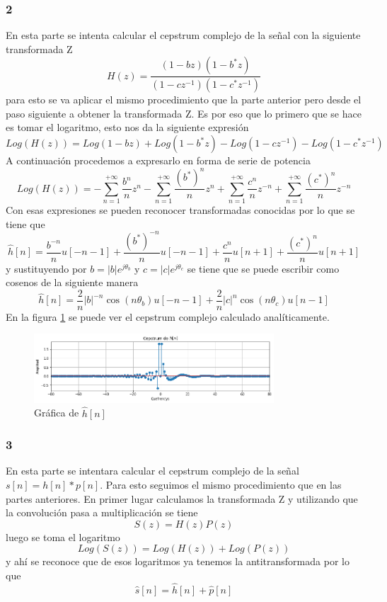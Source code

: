 \documentclass[a4paper]{article}
\begin{document}
\subsubsection{2}
En esta parte se intenta calcular el cepstrum complejo de la señal con la siguiente transformada Z
$$ H(z) = \frac{(1-bz)(1-b^*z)}{(1-cz^{-1})(1-c^*z^{-1})}$$
para esto se va aplicar el mismo procedimiento que la parte anterior pero desde el paso siguiente a obtener la transformada Z. Es por eso que lo primero que se hace es tomar el logaritmo, esto nos da la siguiente expresión
$$Log(H(z)) = Log(1-bz) + Log(1-b^*z) - Log(1-cz^{-1}) -Log(1-c^*z^{-1})$$
A continuación procedemos a expresarlo en forma de serie de potencia
$$Log(H(z)) = -\sum_{n=1}^{+\infty} \frac{b^n}{n}z^n -\sum_{n=1}^{+\infty} \frac{(b^*)^n}{n}z^n + \sum_{n=1}^{+\infty} \frac{c^n}{n}z^{-n} + \sum_{n=1}^{+\infty} \frac{(c^*)^n}{n}z^{-n}$$
Con esas expresiones se pueden reconocer transformadas conocidas por lo que se tiene que
$$\hat{h}[n] = \frac{b^{-n}}{n}u[-n-1] + \frac{(b^*)^{-n}}{n}u[-n-1] +\frac{c^{n}}{n}u[n+1]+\frac{(c^*)^{n}}{n}u[n+1]$$
y sustituyendo por $b=|b|e^{j\theta_b}$ y $c=|c|e^{j\theta_c}$ se tiene que se puede escribir como cosenos de la siguiente manera
$$\hat{h}[n]=\frac{2}{n}|b|^{-n}\cos(n\theta_b)u[-n-1] + \frac{2}{n}|c|^n\cos(n\theta_c)u[n-1]$$
En la figura \ref{hhath} se puede ver el cepstrum complejo calculado analíticamente.
\begin{figure}[h!]
\centering
\includegraphics[width=0.8\textwidth]{hhath.png}
\caption{Gráfica de $\hat{h}[n]$}
\label{hhath}
\end{figure}

\subsubsection{3}
En esta parte se intentara calcular el cepstrum complejo de la señal $s[n] = h[n]*p[n]$. Para esto seguimos el mismo procedimiento que en las partes anteriores. En primer lugar calculamos la transformada Z y utilizando que la convolución pasa a multiplicación se tiene
$$S(z) = H(z)P(z)$$
luego se toma el logaritmo
$$Log(S(z)) = Log(H(z))+Log(P(z))$$
y ahí se reconoce que de esos logaritmos ya tenemos la antitransformada por lo que
$$\hat{s}[n]=\hat{h}[n]+\hat{p}[n]$$
\end{document}
